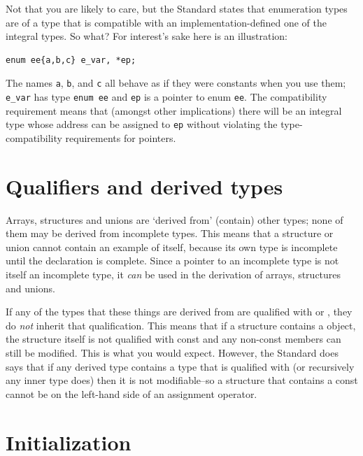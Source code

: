   Not that you are likely to care, but the Standard states that enumeration
   types are of a type that is compatible with an implementation-defined one of
   the integral types. So what? For interest's sake here is an
   illustration:


  \begin{Verbatim}
enum ee{a,b,c} e_var, *ep;
\end{Verbatim}

  The names \texttt{a}, \texttt{b}, and \texttt{c} all behave as
   if they were \kint{} constants when you use them;
   \texttt{e\_var} has type \texttt{enum ee} and \texttt{ep} is
   a pointer to enum \texttt{ee}. The compatibility requirement means that
   (amongst other implications) there will be an integral type whose address
   can be assigned to \texttt{ep} without violating the type-compatibility
   requirements for pointers.


 
        \section{Qualifiers and derived types}
        

  

  Arrays, structures and unions are `derived from' (contain) other
   types; none of them may be derived from incomplete types. This means that
   a structure or union cannot contain an example of itself, because its own
   type is incomplete until the declaration is complete. Since a pointer to an
   incomplete type is not itself an incomplete type, it \textit{can} be used in
   the derivation of arrays, structures and unions.


  If any of the types that these things are derived from are qualified with
   \const{} or \volatile, they do \textit{not} inherit
   that qualification. This means that if a structure contains
   a \const{} object, the structure itself is not qualified with
   const and any non-const members can still be modified. This is what you
   would expect. However, the Standard does says that if any derived type
   contains a type that is qualified with \const{} (or recursively
   any inner type does) then it is not modifiable--so a structure that
   contains a const cannot be on the left-hand side of an assignment
   operator.


 
        \section{Initialization}
        

